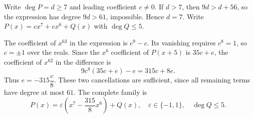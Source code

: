 Write $\deg P=d\ge7$ and leading coefficient $c\ne0$. If $d>7$, then $9d>d+56$, so the expression has degree $9d>61$, impossible. Hence $d=7$. Write $P(x)=cx^7+ex^6+Q(x)$ with $\deg Q\le5$.

The coefficient of $x^{63}$ in the expression is $c^9-c$. Its vanishing requires $c^8=1$, so $c=\pm1$ over the reals. Since the $x^6$ coefficient of $P(x+5)$ is $35c+e$, the coefficient of $x^{62}$ in the difference is
\[
9c^8(35c+e)-e=315c+8e.
\]
Thus $e=-315\dfrac{c}{8}$. These two cancellations are sufficient, since all remaining terms have degree at most $61$. The complete family is
\[
\boxed{P(x)=\varepsilon\left(x^7-\dfrac{315}{8}x^6\right)+Q(x),\quad
\varepsilon\in\{-1,1\},\quad\deg Q\le5}.
\]
